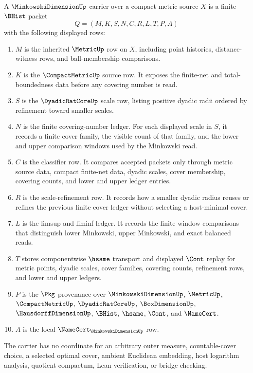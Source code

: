\begin{definition}
\label{def:minkowski-dimension-carrier}
A $\MinkowskiDimensionUp$ carrier over a compact metric source $X$ is a finite $\BHist$ packet
$$
Q=(M,K,S,N,C,R,L,T,P,A)
$$
with the following displayed rows:
\begin{enumerate}
\item $M$ is the inherited $\MetricUp$ row on $X$, including point histories, distance-witness rows, and ball-membership comparisons.
\item $K$ is the $\CompactMetricUp$ source row. It exposes the finite-net and total-boundedness data before any covering number is read.
\item $S$ is the $\DyadicRatCoreUp$ scale row, listing positive dyadic radii ordered by refinement toward smaller scales.
\item $N$ is the finite covering-number ledger. For each displayed scale in $S$, it records a finite cover family, the visible count of that family, and the lower and upper comparison windows used by the Minkowski read.
\item $C$ is the classifier row. It compares accepted packets only through metric source data, compact finite-net data, dyadic scales, cover membership, covering counts, and lower and upper ledger entries.
\item $R$ is the scale-refinement row. It records how a smaller dyadic radius reuses or refines the previous finite cover ledger without selecting a host-minimal cover.
\item $L$ is the limsup and liminf ledger. It records the finite window comparisons that distinguish lower Minkowski, upper Minkowski, and exact balanced reads.
\item $T$ stores componentwise $\hsame$ transport and displayed $\Cont$ replay for metric points, dyadic scales, cover families, covering counts, refinement rows, and lower and upper ledgers.
\item $P$ is the $\Pkg$ provenance over $\MinkowskiDimensionUp$, $\MetricUp$, $\CompactMetricUp$, $\DyadicRatCoreUp$, $\BoxDimensionUp$, $\HausdorffDimensionUp$, $\BHist$, $\hsame$, $\Cont$, and $\NameCert$.
\item $A$ is the local $\NameCert_{\MinkowskiDimensionUp}$ row.
\end{enumerate}
The carrier has no coordinate for an arbitrary outer measure, countable-cover choice, a selected optimal cover, ambient Euclidean embedding, host logarithm analysis, quotient compactum, Lean verification, or bridge checking.
\end{definition}

